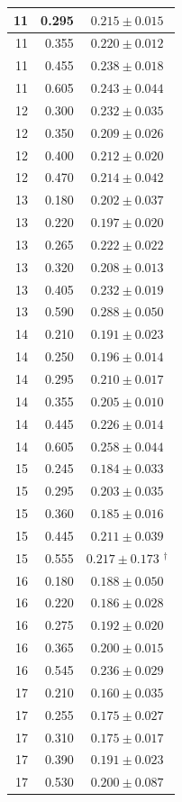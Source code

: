 \begin{longtable}{|r|r|c|}
\hline
11 & 0.295 & $0.215\pm0.015$ \\
\hline
11 & 0.355 & $0.220\pm0.012$ \\
\hline
11 & 0.455 & $0.238\pm0.018$ \\
\hline
11 & 0.605 & $0.243\pm0.044$ \\
\hline
12 & 0.300 & $0.232\pm0.035$ \\
\hline
12 & 0.350 & $0.209\pm0.026$ \\
\hline
12 & 0.400 & $0.212\pm0.020$ \\
\hline
12 & 0.470 & $0.214\pm0.042$ \\
\hline
13 & 0.180 & $0.202\pm0.037$ \\
\hline
13 & 0.220 & $0.197\pm0.020$ \\
\hline
13 & 0.265 & $0.222\pm0.022$ \\
\hline
13 & 0.320 & $0.208\pm0.013$ \\
\hline
13 & 0.405 & $0.232\pm0.019$ \\
\hline
13 & 0.590 & $0.288\pm0.050$ \\
\hline
14 & 0.210 & $0.191\pm0.023$ \\
\hline
14 & 0.250 & $0.196\pm0.014$ \\
\hline
14 & 0.295 & $0.210\pm0.017$ \\
\hline
14 & 0.355 & $0.205\pm0.010$ \\
\hline
14 & 0.445 & $0.226\pm0.014$ \\
\hline
14 & 0.605 & $0.258\pm0.044$ \\
\hline
15 & 0.245 & $0.184\pm0.033$ \\
\hline
15 & 0.295 & $0.203\pm0.035$ \\
\hline
15 & 0.360 & $0.185\pm0.016$ \\
\hline
15 & 0.445 & $0.211\pm0.039$ \\
\hline
15 & 0.555 & $0.217\pm0.173$ $^{\dagger}$ \\
\hline
16 & 0.180 & $0.188\pm0.050$ \\
\hline
16 & 0.220 & $0.186\pm0.028$ \\
\hline
16 & 0.275 & $0.192\pm0.020$ \\
\hline
16 & 0.365 & $0.200\pm0.015$ \\
\hline
16 & 0.545 & $0.236\pm0.029$ \\
\hline
17 & 0.210 & $0.160\pm0.035$ \\
\hline
17 & 0.255 & $0.175\pm0.027$ \\
\hline
17 & 0.310 & $0.175\pm0.017$ \\
\hline
17 & 0.390 & $0.191\pm0.023$ \\
\hline
17 & 0.530 & $0.200\pm0.087$ \\
\hline
\end{longtable}
\endgroup

